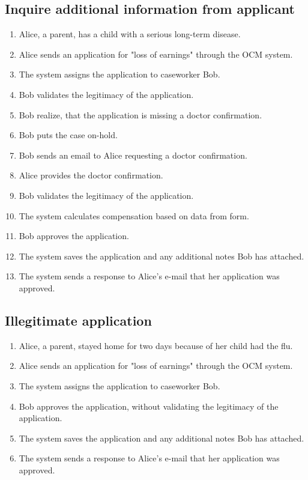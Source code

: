 \documentclass{article}
\begin{document}
\subsection*{Inquire additional information from applicant}
\begin{enumerate}
    \item Alice, a parent, has a child with a serious long-term disease.
    \item Alice sends an application for "loss of earnings" through the OCM system. 
    \item The system assigns the application to caseworker Bob.
    \item Bob validates the legitimacy of the application.
    \item Bob realize, that the application is missing a doctor confirmation. 
    \item Bob puts the case on-hold.
    \item Bob sends an email to Alice requesting a doctor confirmation.
    \item Alice provides the doctor confirmation.
    \item Bob validates the legitimacy of the application.
    \item The system calculates compensation based on data from form. 
    \item Bob approves the application.
    \item The system saves the application and any additional notes Bob has attached.
    \item The system sends a response to Alice's e-mail that her application was approved. 
\end{enumerate}

\subsection*{Illegitimate application}
\begin{enumerate}
    \item Alice, a parent, stayed home for two days because of her child had the flu. 
    \item Alice sends an application for "loss of earnings" through the OCM system.
    \item The system assigns the application to caseworker Bob.
    \item Bob approves the application, without validating the legitimacy of the application.
    \item The system saves the application and any additional notes Bob has attached.
    \item The system sends a response to Alice's e-mail that her application was approved.
\end{enumerate}
\end{document}
